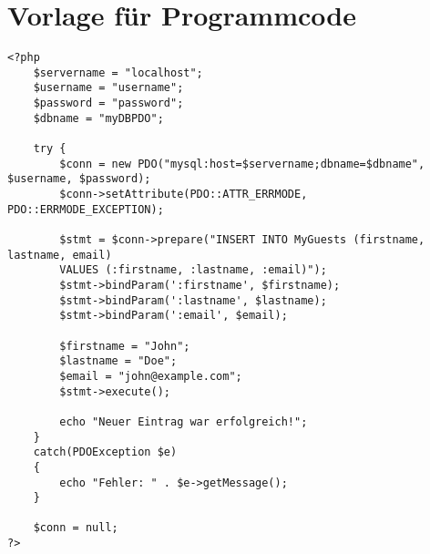 \documentclass[ngerman,pdftex,12pt,a4paper]{scrreprt}
\begin{document}
\chapter{ Vorlage für Programmcode}

\begin{lstlisting}[caption={Sichere SQL-Abfrage mittels PDO}, label={lis:loginphpsecure}, style=php]
<?php
	$servername = "localhost";
	$username = "username";
	$password = "password";
	$dbname = "myDBPDO";

	try {
    	$conn = new PDO("mysql:host=$servername;dbname=$dbname", $username, $password);
    	$conn->setAttribute(PDO::ATTR_ERRMODE, PDO::ERRMODE_EXCEPTION);
	
    	$stmt = $conn->prepare("INSERT INTO MyGuests (firstname, lastname, email)
    	VALUES (:firstname, :lastname, :email)");
    	$stmt->bindParam(':firstname', $firstname);
    	$stmt->bindParam(':lastname', $lastname);
    	$stmt->bindParam(':email', $email);

    	$firstname = "John";
    	$lastname = "Doe";
    	$email = "john@example.com";
    	$stmt->execute();

    	echo "Neuer Eintrag war erfolgreich!";
    }
	catch(PDOException $e)
    {
    	echo "Fehler: " . $e->getMessage();
    }
    
	$conn = null;
?>
\end{lstlisting}
\end{document}
